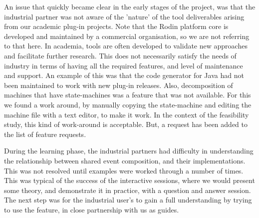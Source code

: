 \documentclass{llncs}%
\begin{document}
An issue that quickly became clear in the early stages of the project, was that the industrial partner was not aware of the 'nature' of the tool deliverables arising from our academic plug-in projects. Note that the Rodin platform core is developed and maintained by a commercial organisation, so we are not referring to that here. In academia, tools are often developed to validate new approaches and facilitate further research. This does not necessarily satisfy the needs of industry in terms of having all the required features, and  level of maintenance and support. An example of this was that the code generator for Java had not been maintained to work with new plug-in releases. Also, decomposition of machines that have state-machines was a feature that was not available. For this we found a work around, by manually copying the state-machine and editing the machine file with a text editor, to make it work. In the context of the feasibility study, this kind of work-around is acceptable. But, a request has been added to the list of feature requests. 
 

During the learning phase, the industrial partners had difficulty in understanding the relationship between shared event composition, and their implementations. This was not resolved until examples were worked through a number of times. This was typical of the success of the interactive sessions, where we would present some theory, and demonstrate it in practice, with a question and answer session. The next step was for the industrial user's to gain a full understanding by trying to use the feature, in close partnership with us as guides.
\end{document}
